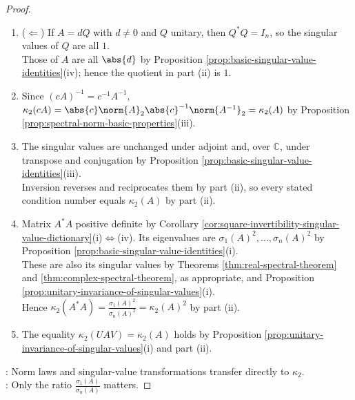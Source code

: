 \begin{proposition}
\begin{proof}
\begin{enumerate}[label=(\roman*)]
Thus $\kappa_2(A)=\frac{\sigma_1(A)}{\sigma_n(A)}\geq1$ by Theorem \ref{thm:spectral-norm-largest-singular-value}(i). For $s\defeq\sigma_1(A)>0$, equality forces $\Sigma=sI_n$, so $A=sXY^*$, a nonzero scalar multiple of a unitary matrix by Theorem \ref{thm:unitary-matrix-equivalent-conditions}(iv) and Proposition \ref{prop:algebra-of-unitary-matrices}(i).
\item[$(ii)$] ($\Leftarrow$) If $A=dQ$ with $d\neq0$ and $Q$ unitary, then $Q^*Q=I_n$, so the singular values of $Q$ are all $1$.\\
Those of $A$ are all $\abs{d}$ by Proposition \ref{prop:basic-singular-value-identities}(iv); hence the quotient in part (ii) is $1$.
\item[$(iii)$] Since $(cA)^{-1}=c^{-1}A^{-1}$, $\kappa_2(cA)=\abs{c}\norm{A}_2\abs{c}^{-1}\norm{A^{-1}}_2=\kappa_2(A)$ by Proposition \ref{prop:spectral-norm-basic-properties}(iii).
\item[$(iv)$] The singular values are unchanged under adjoint and, over $\mathbb{C}$, under transpose and conjugation by Proposition \ref{prop:basic-singular-value-identities}(iii).\\
Inversion reverses and reciprocates them by part (ii), so every stated condition number equals $\kappa_2(A)$ by part (ii).
\item[$(v)$] Matrix $A^*A$ positive definite by Corollary \ref{cor:square-invertibility-singular-value-dictionary}(i)$\Leftrightarrow$(iv). Its eigenvalues are $\sigma_1(A)^2,\ldots,\sigma_n(A)^2$ by Proposition \ref{prop:basic-singular-value-identities}(i).\\
These are also its singular values by Theorems \ref{thm:real-spectral-theorem} and \ref{thm:complex-spectral-theorem}, as appropriate, and Proposition \ref{prop:unitary-invariance-of-singular-values}(i).\\
Hence $\kappa_2(A^*A)=\frac{\sigma_1(A)^2}{\sigma_n(A)^2}=\kappa_2(A)^2$ by part (ii).
\item[$(vi)$] The equality $\kappa_2(UAV)=\kappa_2(A)$ holds by Proposition \ref{prop:unitary-invariance-of-singular-values}(i) and part (ii).
\end{enumerate}
: Norm laws and singular-value transformations transfer directly to $\kappa_2$.\\
: Only the ratio $\frac{\sigma_1(A)}{\sigma_n(A)}$ matters.
\end{proof}
\end{proposition}

